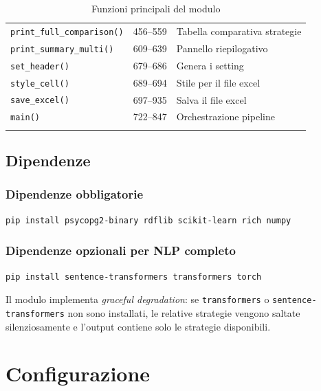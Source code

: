 \documentclass[12pt, a4paper]{report}
\begin{document}
\begin{longtable}{p{5.5cm} p{2.5cm} p{6cm}}
\texttt{print\_full\_comparison()} & 456--559 & Tabella comparativa strategie \\
\texttt{print\_summary\_multi()} & 609--639 & Pannello riepilogativo \\
\texttt{set\_header()} & 679--686 & Genera i setting \\
\texttt{style\_cell()} & 689--694 & Stile per il file excel \\
\texttt{save\_excel()} & 697--935 & Salva il file excel \\
\texttt{main()} & 722--847 & Orchestrazione pipeline \\
\bottomrule
\caption{Funzioni principali del modulo}
\end{longtable}

\section{Dipendenze}

\subsection{Dipendenze obbligatorie}

\begin{lstlisting}[caption={Installazione dipendenze minime}]
pip install psycopg2-binary rdflib scikit-learn rich numpy
\end{lstlisting}

\subsection{Dipendenze opzionali per NLP completo}

\begin{lstlisting}[caption={Installazione dipendenze NLP}]
pip install sentence-transformers transformers torch
\end{lstlisting}

\begin{notebox}
Il modulo implementa \emph{graceful degradation}: se
\texttt{transformers} o \texttt{sentence-transformers} non sono
installati, le relative strategie vengono saltate silenziosamente e
l'output contiene solo le strategie disponibili. 
\end{notebox}

% 
\chapter{Configurazione}
% 
\end{document}
